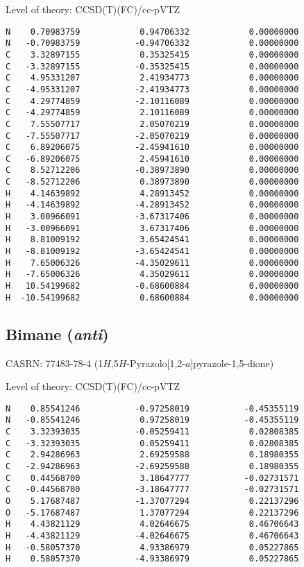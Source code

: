 \documentclass[journal=jctcce,manuscript=article,layout=traditional]{achemso}
\newcommand{\TZ}{cc-pVTZ}
\begin{document}
\begin{singlespace}
\noindent Level of theory: CCSD(T)(FC)/{\TZ}
\begin{verbatim}
N    0.70983759            0.94706332            0.00000000
N   -0.70983759           -0.94706332            0.00000000
C    3.32897155            0.35325415            0.00000000
C   -3.32897155           -0.35325415            0.00000000
C    4.95331207            2.41934773            0.00000000
C   -4.95331207           -2.41934773            0.00000000
C    4.29774859           -2.10116089            0.00000000
C   -4.29774859            2.10116089            0.00000000
C    7.55507717            2.05070219            0.00000000
C   -7.55507717           -2.05070219            0.00000000
C    6.89206075           -2.45941610            0.00000000
C   -6.89206075            2.45941610            0.00000000
C    8.52712206           -0.38973890            0.00000000
C   -8.52712206            0.38973890            0.00000000
H    4.14639892            4.28913452            0.00000000
H   -4.14639892           -4.28913452            0.00000000
H    3.00966091           -3.67317406            0.00000000
H   -3.00966091            3.67317406            0.00000000
H    8.81009192            3.65424541            0.00000000
H   -8.81009192           -3.65424541            0.00000000
H    7.65006326           -4.35029611            0.00000000
H   -7.65006326            4.35029611            0.00000000
H   10.54199682           -0.68600884            0.00000000
H  -10.54199682            0.68600884            0.00000000
\end{verbatim}
\end{singlespace}

\subsection{Bimane (\emph{anti})}

CASRN: 77483-78-4 (1$H$,5$H$-Pyrazolo[1,2-$a$]pyrazole-1,5-dione)

\begin{singlespace}
\noindent  Level of theory: CCSD(T)(FC)/{\TZ}
\begin{verbatim}
N    0.85541246           -0.97258019           -0.45355119 
N   -0.85541246            0.97258019           -0.45355119 
C    3.32393035           -0.05259411            0.02808385 
C   -3.32393035            0.05259411            0.02808385 
C    2.94286963            2.69259588            0.18980355 
C   -2.94286963           -2.69259588            0.18980355 
C    0.44568700            3.18647777           -0.02731571 
C   -0.44568700           -3.18647777           -0.02731571 
O    5.17687487           -1.37077294            0.22137296 
O   -5.17687487            1.37077294            0.22137296 
H    4.43821129            4.02646675            0.46706643 
H   -4.43821129           -4.02646675            0.46706643 
H   -0.58057370            4.93386979            0.05227865 
H    0.58057370           -4.93386979            0.05227865 
\end{verbatim}
\end{singlespace}
\end{document}
